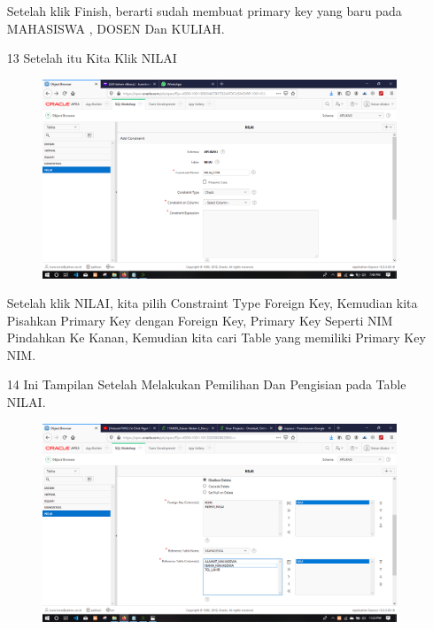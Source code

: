 \begin{enumerate}
\par
Setelah klik Finish, berarti sudah membuat primary key yang baru pada MAHASISWA , DOSEN Dan KULIAH.

\newpage
\item[13]Setelah itu Kita Klik NILAI

\begin{figure}[!htbp]
    \begin{center}
    \includegraphics[scale=0.2]{figures/17.png}
    \end{center}   
    \end{figure}
    
\par
Setelah klik NILAI, kita pilih Constraint Type Foreign Key, Kemudian kita Pisahkan Primary Key dengan Foreign Key, Primary Key Seperti NIM Pindahkan Ke Kanan, Kemudian kita cari Table yang memiliki Primary Key NIM.

\item[14]Ini Tampilan Setelah Melakukan Pemilihan Dan Pengisian pada Table NILAI.

\begin{figure}[!htbp]
    \begin{center}
    \includegraphics[scale=0.2]{figures/18.png}
    \end{center}   
    \end{figure}
    

\end{enumerate}
